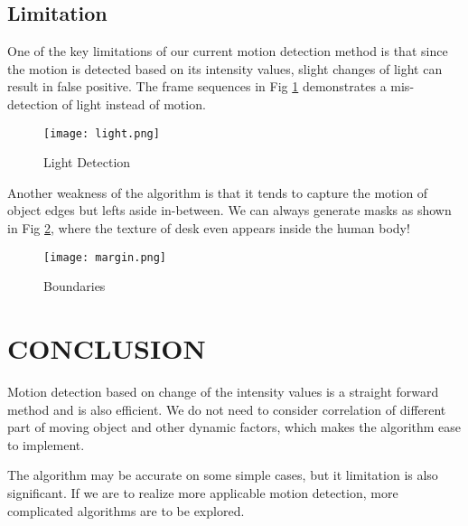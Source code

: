 \documentclass[letterpaper, 10 pt, conference]{ieeeconf}
\begin{document}
\subsection{Limitation}
One of the key limitations of our current motion detection method is that since the motion is detected based on its intensity values, slight changes of light can result in false positive. The frame sequences in Fig \ref{light} demonstrates a mis-detection of light instead of motion.
\begin{figure}[thpb]
\centering
\texttt{[image: light.png]}
\caption{Light Detection}
\label{light}
\end{figure}

Another weakness of the algorithm is that it tends to capture the motion of object edges but lefts aside in-between. We can always generate masks as shown in Fig \ref{bound}, where the texture of desk even appears inside the human body!

\begin{figure}[thpb]
\centering
\texttt{[image: margin.png]}
\caption{Boundaries}
\label{bound}
\end{figure}

\section{CONCLUSION}
Motion detection based on change of the intensity values is a straight forward method and is also efficient. We do not need to consider correlation of different part of moving object and other dynamic factors, which makes the algorithm ease to implement.

The algorithm may be accurate on some simple cases, but it limitation is also significant. If we are to realize more applicable motion detection, more complicated algorithms are to be explored.
\end{document}
